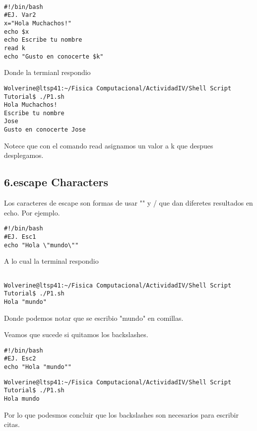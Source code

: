 \documentclass[a4paper]{article}
\begin{document}
\begin{verbatim}

#!/bin/bash
#EJ. Var2
x="Hola Muchachos!"
echo $x
echo Escribe tu nombre
read k
echo "Gusto en conocerte $k"

\end{verbatim}

Donde la termianl respondio

\begin{verbatim}
Wolverine@ltsp41:~/Fisica Computacional/ActividadIV/Shell Script Tutorial$ ./P1.sh
Hola Muchachos!
Escribe tu nombre
Jose
Gusto en conocerte Jose

\end{verbatim}

Notece que con el comando read asignamos un valor a k que despues desplegamos. 

\subsection{6.escape Characters}

Los caracteres de escape son formas de usar "" y / que dan diferetes resultados en echo. Por ejemplo.




\begin{verbatim}
#!/bin/bash
#EJ. Esc1
echo "Hola \"mundo\""
\end{verbatim}

A lo cual la terminal respondio

\begin{verbatim}

Wolverine@ltsp41:~/Fisica Computacional/ActividadIV/Shell Script Tutorial$ ./P1.sh
Hola "mundo"

\end{verbatim}
Donde podemos notar que se escribio "mundo" en comillas.  

Veamos que sucede si quitamos los backslashes.

\begin{verbatim}
#!/bin/bash
#EJ. Esc2
echo "Hola "mundo""

\end{verbatim}
\begin{verbatim}
Wolverine@ltsp41:~/Fisica Computacional/ActividadIV/Shell Script Tutorial$ ./P1.sh
Hola mundo
\end{verbatim}

Por lo que podesmos concluir que los backslashes son necesarios para escribir citas.
\end{document}
